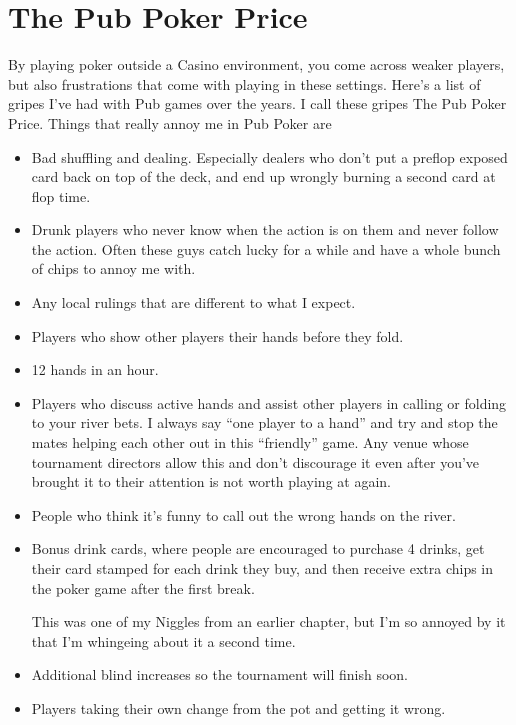 \chapter{The Pub Poker Price}


By playing poker outside a Casino environment, you come across
weaker players, but also frustrations that come with playing
in these settings. Here's a list of gripes I've had with Pub
games over the years. I call these gripes The Pub Poker Price.
Things that really annoy me in Pub Poker are

\begin{itemize}

\item Bad shuffling and dealing. Especially dealers who don't
put a preflop exposed card back on top of the deck, and end
up wrongly burning a second card at flop time.

\item Drunk players who never know when the action is on them and
never follow the action. Often these guys catch lucky for a while
and have a whole bunch of chips to annoy me with.

\item Any local rulings that are different to what I expect.

\item Players who show other players their hands before they fold.

\item 12 hands in an hour.

\item Players who discuss active hands and assist other players in
calling or folding to your river bets. I always say ``one
player to a hand'' and try and stop the mates helping each other
out in this ``friendly'' game. Any venue whose tournament directors
allow this and don't discourage it even after you've brought
it to their attention is not worth playing at again.

\item People who think it's funny to call out the wrong hands on the river.

\item Bonus drink cards, where people are encouraged to purchase 4 drinks,
get their card stamped for each drink they buy, and then receive extra
chips in the poker game after the first break.

This was one of my Niggles from an earlier chapter, but I'm so annoyed
by it that I'm whingeing about it a second time.

\item Additional blind increases so the tournament will finish soon.

\item Players taking their own change from the pot and getting it wrong.

\end{itemize}

